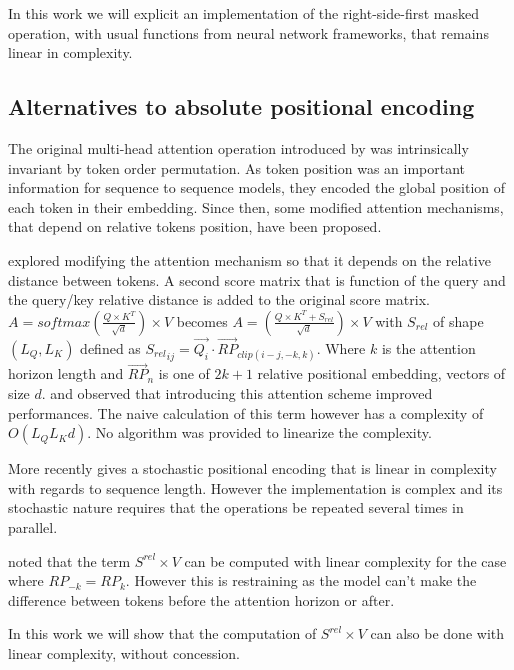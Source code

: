 In this work we will explicit an implementation of the right-side-first masked operation, with usual functions from neural network frameworks, that remains linear in complexity.

\subsection{Alternatives to absolute positional
encoding}

The original multi-head attention operation introduced by
\citet{vaswani2017attention} was
intrinsically invariant by token order permutation. As token position was
an important information for sequence to sequence models, they encoded
the global position of each token in their embedding. Since then, some
modified attention mechanisms, that depend on relative tokens position,
have been proposed.

\citet{shaw2018selfattention} explored
modifying the attention mechanism so that it depends on the relative
distance between tokens. A second score matrix that is function of the
query and the query/key relative distance is added to the original score
matrix. $A = softmax\left(\frac{Q \times K^T}{\sqrt{d}}\right) \times V$ becomes
$A = \left(\frac{Q \times K^T + S_{rel}}{\sqrt{d}}\right) \times V$ with $S_{rel}$ of shape $(L_Q, L_K)$ defined as
${S_{rel}}_{ij} = \vec{Q_i} \cdotp \vec{RP}_{clip(i-j, -k, k)}$. Where $k$ is the attention horizon length and $\vec{RP}_n$ is one of
$2k+1$ relative positional embedding, vectors of size $d$.
\citet{shaw2018selfattention} and
\citet{huang2018music} observed that introducing this attention scheme improved performances.
The naive calculation of this term however has a complexity of
$O(L_QL_Kd)$. No algorithm was provided to linearize the complexity.

More recently \citet{liutkus2021relative} gives a stochastic positional encoding that is linear in
complexity with regards to sequence length. However the implementation
is complex and its stochastic nature requires that the operations be
repeated several times in parallel.

\citet{horn2021translational} noted that
the term $S^{rel} \times V$ can be computed with linear complexity for
the case where $RP_{-k} = RP_{k}$. However this is restraining as the
model can't make the difference between tokens before the attention
horizon or after.

In this work we will show that the computation of $S^{rel} \times V$
can also be done with linear complexity, without concession.

\endinput

